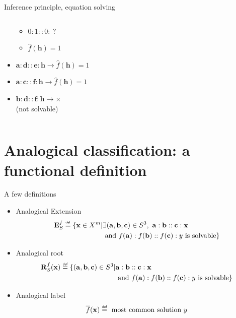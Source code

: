 \documentclass{beamer}
\begin{document}
\begin{frame}{Inference principle, equation solving}
\begin{columns}
\begin{column}{0.5\textwidth}
\begin{itemize}
{\begin{itemize}
            \item $0:1::0:~?$
            \item $\hat{f}(\mathbf{h}) = 1$
          \end{itemize}
            }
        \item $\mathbf{a} : \mathbf{d} :: \mathbf{e} : \mathbf{h}\rightarrow
          \hat{f}(\mathbf{h}) = 1$
        \item $\mathbf{a} : \mathbf{c} :: \mathbf{f} : \mathbf{h}\rightarrow
          \hat{f}(\mathbf{h}) = 1$
        \item $\mathbf{b} : \mathbf{d} :: \mathbf{f} : \mathbf{h}\rightarrow
          \times$\\(not solvable)
      \end{itemize}

    \end{column}
  \end{columns}
\end{frame}

\section[Analogical classification]{Analogical classification: a functional definition}

\begin{frame}{A few definitions}
  \begin{itemize}
    \item \alert{Analogical Extension}
        \begin{align*}
          \esf \eqdef \{ \mathbf{x} \in X^m |  &\exists
          (\mathbf{a},\mathbf{b},\mathbf{c}) \in S^3, ~ \mathbf{a} : \mathbf{b}
          :: \mathbf{c} : \mathbf{x}\\
          &\text{ and } f(\mathbf{a}) : f(\mathbf{b}) ::
          f(\mathbf{c}) : y \text{ is solvable}\}
        \end{align*}

      \item \alert{Analogical root}
      \begin{align*}
        \rsfx \eqdef \{(\mathbf{a}, \mathbf{b}, \mathbf{c}) \in S^3 |
        &\mathbf{a}:\mathbf{b}::\mathbf{c}:\mathbf{x}\\ &\text{ and }
        f(\mathbf{a}):f(\mathbf{b})::f(\mathbf{c}):y \text{ is solvable}\}
      \end{align*}

    \item \alert{Analogical label}
      $$\albl{\mathbf{x}} \eqdef \text{ most common solution }y$$
  \end{itemize}
\end{frame}
\end{document}
